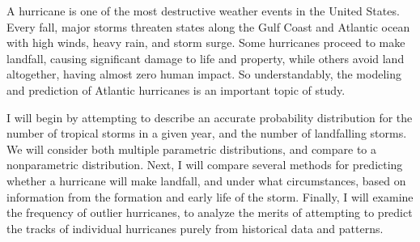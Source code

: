 
\par
A hurricane is one of the most destructive weather events in the United States.
Every fall, major storms threaten states along the Gulf Coast and Atlantic ocean with high winds, heavy rain, and storm surge.
Some hurricanes proceed to make landfall, causing significant damage to life and property, while others avoid land altogether, having almost zero human impact.
So understandably, the modeling and prediction of Atlantic hurricanes is an important topic of study.

\par
I will begin by attempting to describe an accurate probability distribution for the number of tropical storms in a given year, and the number of landfalling storms. We will consider both multiple parametric distributions, and compare to a nonparametric distribution.
Next, I will compare several methods for predicting whether a hurricane will make landfall, and under what circumstances, based on information from the formation and early life of the storm.
Finally, I will examine the frequency of outlier hurricanes, to analyze the merits of attempting to predict the tracks of individual hurricanes purely from historical data and patterns.